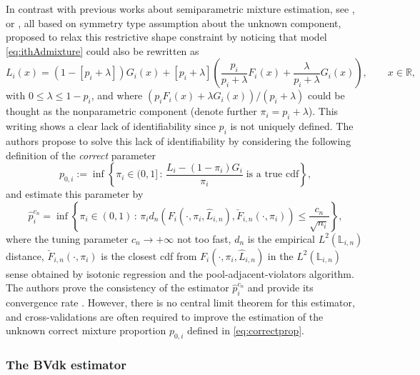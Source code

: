 In contrast with previous works about semiparametric mixture estimation, see \citet{Bordes+Mottelet+Vandekerkhove:2006}, \citet{Bordes+Delmas+Vandekerkhove:2006} or \citet{Butucea+Tzoumpe+Vandekerkhove:2017}, all based on symmetry type assumption about the unknown component, \citet{Patra+Sen:2016} proposed to relax this restrictive shape constraint by noticing that model \eqref{eq:ithAdmixture} could also be rewritten as
\[L_i(x) = (1-[p_i+\lambda]) G_i(x) + [p_i+\lambda] \left( \dfrac{p_i}{p_i+\lambda} F_i(x) + \dfrac{\lambda}{p_i+\lambda} G_i(x) \right), \qquad x \in \mathbb{R},\]
with \(0 \leq \lambda \leq 1-p_i\), and where \((p_i F_i(x) + \lambda G_i(x))/(p_i+\lambda)\) could be thought as the nonparametric component (denote further \(\pi_i = p_i+\lambda\)). This writing shows a clear lack of identifiability since \(p_i\) is not uniquely defined. The authors propose to solve this lack of identifiability by considering the following definition of the \emph{correct} parameter
\begin{equation}
p_{0,i} := \inf \left\{ \pi_i \in (0,1] \, : \, \frac{L_i - (1-\pi_i)G_i}{\pi_i} \; \text{is a true cdf} \right\},
\label{eq:correctprop}
\end{equation}
and estimate this parameter by
\[
\hat p_i^{c_n} = \inf \left\{ \pi_i \in (0,1) \, : \, 
\pi_i d_n\!\left( F_i(\cdot,\pi_i,\hat L_{i,n}), \check{F}_{i,n}(\cdot,\pi_i)\right) 
\leq \frac{c_n}{\sqrt{n_i}} \right\},
\]
where the tuning parameter \(c_n \to +\infty\) not too fast, \(d_n\) is the empirical \(L^2(\mathbb L_{i,n})\) distance,
\(\check F_{i,n}(\cdot,\pi_i)\) is the closest cdf from \(F_i(\cdot,\pi_i,\hat L_{i,n})\) in the \(L^2(\mathbb L_{i,n})\) sense obtained by isotonic regression and the pool-adjacent-violators algorithm. The authors prove the consistency of the estimator \(\hat p_i^{c_n}\) and provide its convergence rate \citep[see Theorem 4 in][]{Patra+Sen:2016}. However, there is no central limit theorem for this estimator, and cross-validations are often required to improve the estimation of the unknown correct mixture proportion \(p_{0,i}\) defined in \eqref{eq:correctprop}.

\subsubsection{The BVdk estimator}\label{the-bvdk-estimator}

